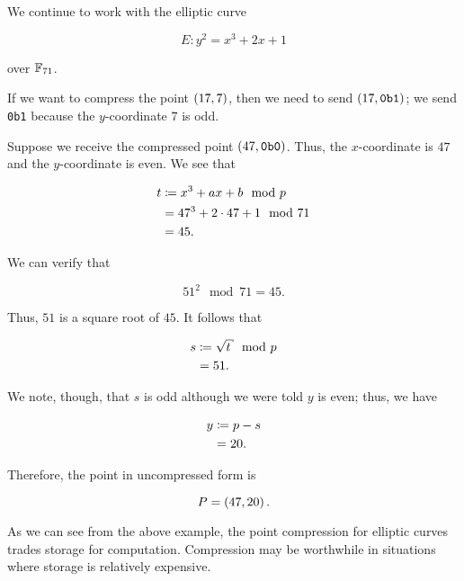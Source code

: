 \begin{example}

We continue to work with the \gls{elliptic curve}

\begin{equation}
    E: y^{2} = x^{3} + 2x + 1
\end{equation}

\noindent
over $\mathbb{F}_{71}$.

If we want to compress the point $\left( 17,7 \right)$,
then we need to send $\left( 17,\texttt{0b1} \right)$;
we send \texttt{0b1} because the $y$-coordinate $7$ is odd.

Suppose we receive the compressed point $\left( 47,\texttt{0b0} \right)$.
Thus, the $x$-coordinate is $47$ and the $y$-coordinate is even.
We see that

\begin{align}
    t &\coloneqq{} x^{3} + ax + b \mod p\nonumber\\
        &= 47^{3} + 2\cdot47 + 1 \mod 71 \nonumber\\
        &= 45.
\end{align}

\noindent
We can verify that

\begin{equation}
    51^{2} \mod 71 = 45.
\end{equation}

\noindent
Thus, $51$ is a square root of $45$.
It follows that

\begin{align}
    s &\mathDef{} \sqrt{t} \mod p \nonumber\\
        &= 51.
\end{align}

\noindent
We note, though, that $s$ is odd although we were told $y$ is even;
thus, we have

\begin{align}
    y &\coloneqq{} p - s \nonumber\\
        &= 20.
\end{align}

\noindent
Therefore, the point in uncompressed form is

\begin{equation}
    P = \left( 47,20 \right).
\end{equation}
\end{example}

As we can see from the above example,
the point compression for \glspl{elliptic curve} trades
storage for computation.
Compression may be worthwhile in situations where
storage is relatively expensive.

